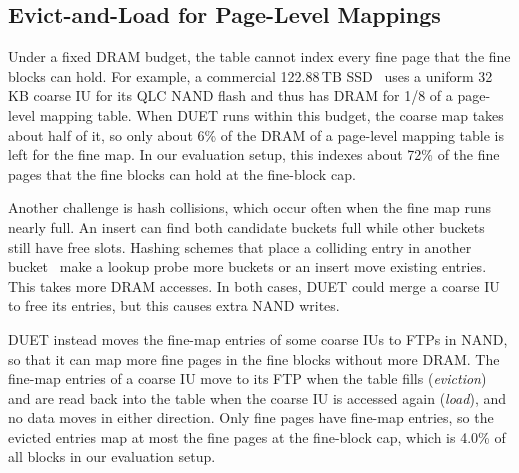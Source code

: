 \subsection{Evict-and-Load for Page-Level Mappings}
\label{sec:spill}
Under a fixed DRAM budget, the table cannot index every fine page that the fine
blocks can hold.
For example, a commercial 122.88\,TB SSD~\cite{solidigm-p5336-spec} uses a uniform 32\,KB coarse IU
for its QLC NAND flash and thus has DRAM for
1/8 of a page-level mapping table. When DUET runs within this budget, the
coarse map takes about half of it, so only about 6\% of the DRAM of a page-level
mapping table is left for the fine map. In our
evaluation setup, this indexes about 72\% of the fine pages that the fine blocks can
hold at the fine-block cap.

Another challenge is hash collisions, which occur often when the fine map runs nearly full. An insert can find both candidate buckets
full while other buckets still have free slots. Hashing schemes that place a
colliding entry in another bucket~\cite{cuckoo,onemove,hopscotch,robinhood} make a
lookup probe more buckets or an insert move existing entries. This takes more DRAM
accesses.
In both cases, DUET could merge a coarse IU to free its entries, but this causes extra NAND writes.

DUET instead moves the fine-map entries of some coarse IUs to FTPs in NAND, so that
it can map more fine pages in the fine blocks without more DRAM.
The fine-map entries of a coarse IU move to its FTP when the table fills
(\emph{eviction}) and are read back into the table when the coarse IU is accessed again
(\emph{load}), and no data moves in either direction. Only fine pages have fine-map
entries, so the evicted entries map at most the fine pages at the fine-block cap, which
is 4.0\% of all blocks in our evaluation setup.

